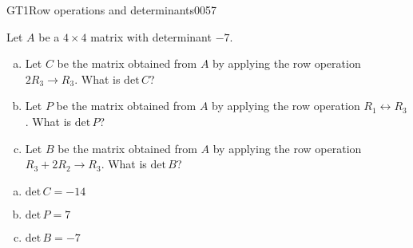 \begin{exercise}{GT1}{Row operations and determinants}{0057} 
\begin{exerciseStatement} 

Let \(A\) be a \(4 \times 4\) matrix with determinant \(-7\).

 

\begin{enumerate}[(a)]
\item Let \(C\) be the matrix obtained from \(A\) by applying the row operation \(2 R_3 \to R_3\). What is \(\mathrm{det}\,C\)?
\item Let \(P\) be the matrix obtained from \(A\) by applying the row operation \(R_1 \leftrightarrow R_3\). What is \(\mathrm{det}\,P\)?
\item Let \(B\) be the matrix obtained from \(A\) by applying the row operation \(R_3 + 2 R_2 \to R_3\). What is \(\mathrm{det}\,B\)?
\end{enumerate}

     \end{exerciseStatement}
 \begin{exerciseAnswer} 

\begin{enumerate}[(a)]
\item \(\mathrm{det}\,C=-14\)
\item \(\mathrm{det}\,P=7\)
\item \(\mathrm{det}\,B=-7\)
\end{enumerate}

     \end{exerciseAnswer}
 \end{exercise}



